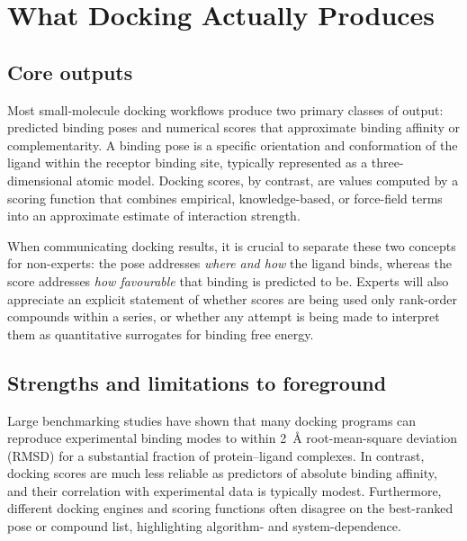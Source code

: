 \documentclass[12pt]{article}
\begin{document}
\section{What Docking Actually Produces}

\subsection{Core outputs}

Most small-molecule docking workflows produce two primary classes of output: predicted binding poses and numerical scores that approximate binding affinity or complementarity.\cite{CH11_Kitchen2004,CH11_Pagadala2017,CH11_AutoDockVina2010} 
A binding pose is a specific orientation and conformation of the ligand within the receptor binding site, typically represented as a three-dimensional atomic model.\cite{CH11_Kitchen2004,CH11_Glide2004,CH11_cosconati2010} 
Docking scores, by contrast, are values computed by a scoring function that combines empirical, knowledge-based, or force-field terms into an approximate estimate of interaction strength.\cite{CH11_Jain2006,CH11_EmpiricalScoring2018,CH11_Warren2006} 

When communicating docking results, it is crucial to separate these two concepts for non-experts: the pose addresses \emph{where and how} the ligand binds, whereas the score addresses \emph{how favourable} that binding is predicted to be.\cite{CH11_Kitchen2004,CH11_Forli2015,CH11_BindingAffinity2018} 
Experts will also appreciate an explicit statement of whether scores are being used only rank-order compounds within a series, or whether any attempt is being made to interpret them as quantitative surrogates for binding free energy.\cite{CH11_Warren2006,CH11_Plewczynski2011,CH11_BindingAffinity2018} 

\subsection{Strengths and limitations to foreground}

Large benchmarking studies have shown that many docking programs can reproduce experimental binding modes to within 2~\AA{} root-mean-square deviation (RMSD) for a substantial fraction of protein--ligand complexes.\cite{CH11_Warren2006,CH11_Glide2004,CH11_Plewczynski2011} 
In contrast, docking scores are much less reliable as predictors of absolute binding affinity, and their correlation with experimental data is typically modest.\cite{CH11_Warren2006,CH11_EmpiricalScoring2018,CH11_BindingAffinity2018} 
Furthermore, different docking engines and scoring functions often disagree on the best-ranked pose or compound list, highlighting algorithm- and system-dependence.\cite{CH11_Plewczynski2011,CH11_ConsensusDocking2023,CH11_EmpiricalScoring2018} 
\end{document}

